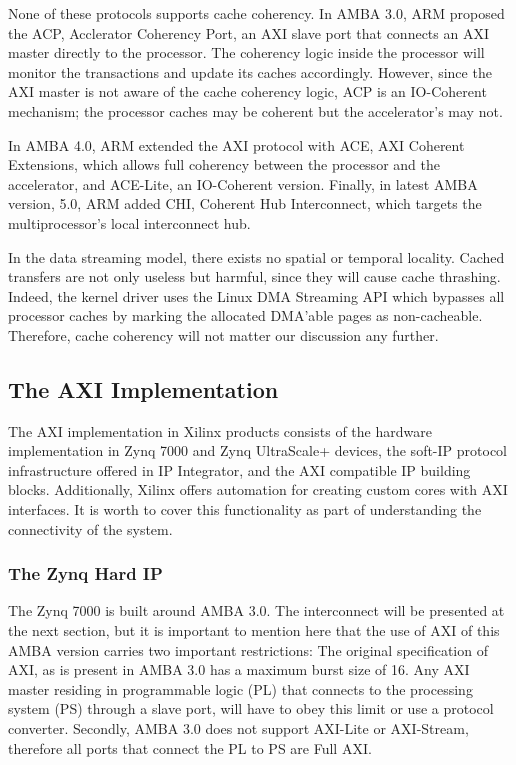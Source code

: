 None of these protocols supports cache coherency. 
In AMBA 3.0, ARM proposed the ACP, Acclerator Coherency Port, 
an AXI slave port that connects an AXI master directly to the processor.
The coherency logic inside the processor will monitor the transactions and update its caches accordingly.
However, since the AXI master is not aware of the cache coherency logic, ACP is an IO-Coherent mechanism;
the processor caches may be coherent but the accelerator's may not.

In AMBA 4.0, ARM extended the AXI protocol with ACE, AXI Coherent Extensions, which allows full coherency between
the processor and the accelerator, and ACE-Lite, an IO-Coherent version. 
Finally, in latest AMBA version, 5.0, ARM added CHI, Coherent Hub Interconnect, which targets the multiprocessor's
local interconnect hub.

In the data streaming model, there exists no spatial or temporal locality. 
Cached transfers are not only useless but harmful, since they will cause cache thrashing. 
Indeed, the kernel driver uses the Linux DMA Streaming API which bypasses all processor caches 
by marking the allocated DMA'able pages as non-cacheable.
Therefore, cache coherency will not matter our discussion any further.

\subsection{The AXI Implementation}

The AXI implementation in Xilinx products consists of the hardware 
implementation in Zynq 7000 and Zynq UltraScale+ devices,
the soft-IP protocol infrastructure offered in IP Integrator, 
and the AXI compatible IP building blocks. 
Additionally, Xilinx offers automation for creating 
custom cores with AXI interfaces.
It is worth to cover this functionality as 
part of understanding the connectivity of the system.

\subsubsection{The Zynq Hard IP}

The Zynq 7000 is built around AMBA 3.0. 
The interconnect will be presented at the next section,
but it is important to mention here that the use of AXI of this AMBA version
carries two important restrictions: The original specification of AXI,
as is present in AMBA 3.0 has a maximum burst size of 16. Any AXI master
residing in programmable logic (PL) that connects to the processing system (PS) through a slave port,
will have to obey this limit or use a protocol converter. Secondly, AMBA 3.0 does not
support AXI-Lite or AXI-Stream, therefore all ports that connect the PL to PS are Full AXI.

